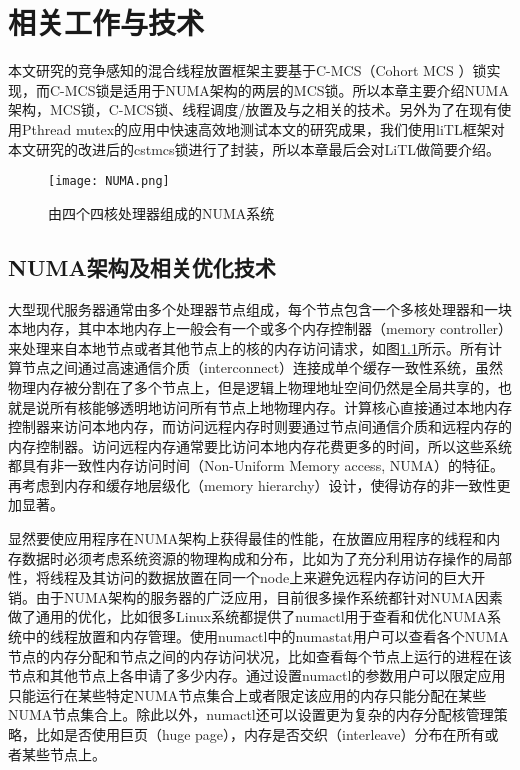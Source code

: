 
\chapter{相关工作与技术}
\label{chap:example}
本文研究的竞争感知的混合线程放置框架主要基于C-MCS（Cohort MCS ）锁实现，而C-MCS锁是适用于NUMA架构的两层的MCS锁。所以本章主要介绍NUMA架构，MCS锁，C-MCS锁、线程调度/放置及与之相关的技术。另外为了在现有使用Pthread mutex的应用中快速高效地测试本文的研究成果，我们使用liTL框架对本文研究的改进后的cstmcs锁进行了封装，所以本章最后会对LiTL做简要介绍。
\begin{figure}[t]
	\centering
	\texttt{[image: NUMA.png]}
	\caption{由四个四核处理器组成的NUMA系统}
	\label{Fig:numa}
\end{figure}
\section{NUMA架构及相关优化技术}

大型现代服务器通常由多个处理器节点组成，每个节点包含一个多核处理器和一块本地内存，其中本地内存上一般会有一个或多个内存控制器（memory controller）来处理来自本地节点或者其他节点上的核的内存访问请求，如图\ref{Fig:numa}所示。所有计算节点之间通过高速通信介质（interconnect）连接成单个缓存一致性系统，虽然物理内存被分割在了多个节点上，但是逻辑上物理地址空间仍然是全局共享的，也就是说所有核能够透明地访问所有节点上地物理内存。计算核心直接通过本地内存控制器来访问本地内存，而访问远程内存时则要通过节点间通信介质和远程内存的内存控制器。访问远程内存通常要比访问本地内存花费更多的时间，所以这些系统都具有非一致性内存访问时间（Non-Uniform Memory access, NUMA）的特征。再考虑到内存和缓存地层级化（memory hierarchy）设计，使得访存的非一致性更加显著。

显然要使应用程序在NUMA架构上获得最佳的性能，在放置应用程序的线程和内存数据时必须考虑系统资源的物理构成和分布，比如为了充分利用访存操作的局部性，将线程及其访问的数据放置在同一个node上来避免远程内存访问的巨大开销。由于NUMA架构的服务器的广泛应用，目前很多操作系统都针对NUMA因素做了通用的优化，比如很多Linux系统都提供了numactl用于查看和优化NUMA系统中的线程放置和内存管理。使用numactl中的numastat用户可以查看各个NUMA节点的内存分配和节点之间的内存访问状况，比如查看每个节点上运行的进程在该节点和其他节点上各申请了多少内存。通过设置numactl的参数用户可以限定应用只能运行在某些特定NUMA节点集合上或者限定该应用的内存只能分配在某些NUMA节点集合上。除此以外，numactl还可以设置更为复杂的内存分配核管理策略，比如是否使用巨页（huge page），内存是否交织（interleave）分布在所有或者某些节点上。

